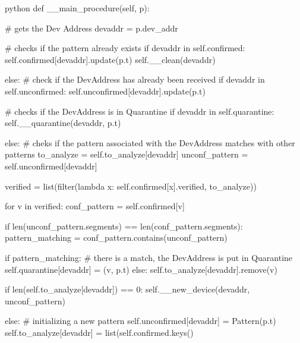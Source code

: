 \begin{mintedbox}{python}
def __main_procedure(self, p):
    
    # gets the Dev Address
    devaddr = p.dev_addr  
    
    # checks if the pattern already exists
    if devaddr in self.confirmed:
        self.confirmed[devaddr].update(p.t)
        self.__clean(devaddr)

    else:
        # check if the DevAddress has already been received
        if devaddr in self.unconfirmed:
            self.unconfirmed[devaddr].update(p.t)
            
            # checks if the DevAddress is in Quarantine
            if devaddr in self.quarantine:
                self.__quarantine(devaddr, p.t)

            else:
                # cheks if the pattern associated with the DevAddress matches with other patterns 
                to_analyze = self.to_analyze[devaddr]
                unconf_pattern = self.unconfirmed[devaddr]


                verified = list(filter(lambda x: self.confirmed[x].verified, to_analyze))

                for v in verified:
                    conf_pattern = self.confirmed[v]        

                    if len(unconf_pattern.segments) == len(conf_pattern.segments):
                        pattern_matching = conf_pattern.contains(unconf_pattern)
                    
                        if pattern_matching:
                            # there is a match, the DevAddress is put in Quarantine        
                            self.quarantine[devaddr] = (v, p.t)      
                        else:
                            self.to_analyze[devaddr].remove(v)

                if len(self.to_analyze[devaddr]) == 0:
                    self.__new_device(devaddr, unconf_pattern)   

        else:
            # initializing a new pattern
            self.unconfirmed[devaddr] = Pattern(p.t)
            self.to_analyze[devaddr] = list(self.confirmed.keys()
\end{mintedbox}